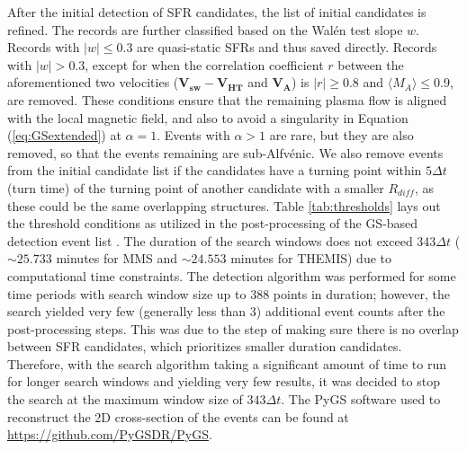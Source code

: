 After the initial detection of SFR candidates, the list of initial candidates is refined. The records are further classified based on the Wal\'en test slope $w$. Records with $|w|\leq0.3$ are quasi-static SFRs and thus saved directly. Records with $|w|>0.3$, except for when the correlation coefficient $r$ between the aforementioned two velocities ($\mathbf{V_{sw}} - \mathbf{V_{HT}}$ and $\mathbf{V_A}$) is $|r|\geq 0.8$ and $\langle M_A\rangle \leq 0.9$, are removed. These conditions ensure that the remaining plasma flow is aligned with the local magnetic field, and also to avoid a singularity in Equation (\ref{eq:GSextended}) at $\alpha=1$. Events with $\alpha>1$ are rare, but they are also removed, so that the events remaining are sub-Alfv\'enic. We also remove events from the initial candidate list if the candidates have a turning point within $5\Delta t$ (turn time) of the turning point of another candidate with a smaller $R_{diff}$, as these could be the same overlapping structures. Table \ref{tab:thresholds} lays out the threshold conditions as utilized in the post-processing of the GS-based detection event list \citep{Chen:2020, Chen:2021, Chen:2022}. The duration of the search windows does not exceed 343$\Delta t$ ($\sim 25.733$ minutes for MMS and $\sim 24.553$ minutes for THEMIS) due to computational time constraints. The detection algorithm was performed for some time periods with search window size up to 388 points in duration; however, the search yielded very few (generally less than 3) additional event counts after the post-processing steps. This was due to the step of making sure there is no overlap between SFR candidates, which prioritizes smaller duration candidates. Therefore, with the search algorithm taking a significant amount of time to run for longer search windows and yielding very few results, it was decided to stop the search at the maximum window size of $343\Delta t$. The PyGS software used to reconstruct the 2D cross-section of the events can be found at \url{https://github.com/PyGSDR/PyGS}.


